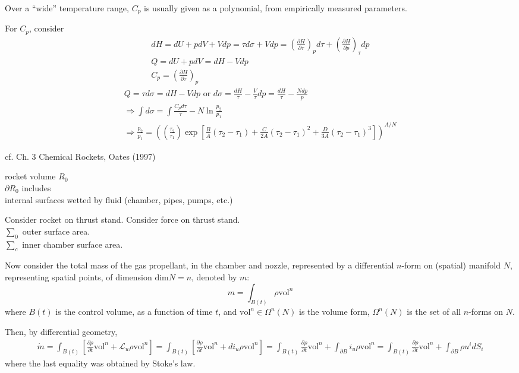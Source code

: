 \documentclass[10pt]{amsart}
\begin{document}
\begin{multicols*}{2}
\hrulefill

Over a ``wide'' temperature range, $C_p$ is usually given as a polynomial, from empirically measured parameters.  

For $C_p$, consider 
\[
\begin{gathered}
  dH = dU + pdV + Vdp = \tau d\sigma + Vdp = \left( \frac{ \partial H}{ \partial \tau} \right)_p d\tau + \left( \frac{ \partial H}{ \partial p} \right)_{\tau} dp \\
  Q = dU + pdV = dH - Vdp \\
  C_p = \left( \frac{ \partial H}{ \partial \tau} \right)_p 
\end{gathered}
\]
\[
\begin{gathered}
  Q = \tau d\sigma = dH - Vdp  \text{ or } d\sigma = \frac{dH}{\tau} - \frac{V}{\tau} dp = \frac{dH}{\tau} - \frac{Ndp}{p} \\
  \Longrightarrow \int d\sigma = \int \frac{C_pd\tau}{\tau} - N \ln{ \frac{p_2}{p_1}} \\
  \Longrightarrow \frac{p_2}{p_1} = \left( \left( \frac{\tau_2}{\tau_1} \right) \exp{ \left[ \frac{B}{A} (\tau_2 - \tau_1) + \frac{C}{2A}(\tau_2 - \tau_1)^2 + \frac{D}{3A}(\tau_2 - \tau_1)^3 \right] } \right)^{A/N}
\end{gathered}
\]


cf. Ch. 3 Chemical Rockets, Oates (1997) \cite{GOates1997}

rocket volume $R_0$ \\
$\partial R_0$ includes \\
\phantom{\quad \, } internal surfaces wetted by fluid (chamber, pipes, pumps, etc.) 

Consider rocket on thrust stand.  Consider force on thrust stand.  \\
$\sum_0$ outer surface area. \\
$\sum_c$ inner chamber surface area. 

Now consider the total mass of the gas propellant, in the chamber and nozzle, represented by a differential $n$-form on (spatial) manifold $N$, representing spatial points, of dimension $\text{dim}N=n$, denoted by $m$:
\[
m = \int_{B(t)} \rho \text{vol}^n
\]
where $B(t)$ is the control volume, as a function of time $t$, and $\text{vol}^n \in \Omega^n(N)$ is the volume form, $\Omega^n(N)$ is the set of all $n$-forms on $N$.  

Then, by differential geometry, 
\[
\begin{gathered}
  \dot{m} = \int_{B(t)} \left[ \frac{ \partial \rho }{ \partial t} \text{vol}^n + \mathcal{L}_u \rho \text{vol}^n \right] = \int_{B(t)} \left[ \frac{ \partial \rho }{ \partial t} \text{vol}^n + di_u \rho \text{vol}^n \right]   = \int_{B(t)} \frac{ \partial \rho}{ \partial t} \text{vol}^n + \int_{\partial B} i_u \rho \text{vol}^n = \int_{B(t)} \frac{ \partial \rho }{ \partial t} \text{vol}^n + \int_{\partial B} \rho u^i dS_i
\end{gathered}
\]
where the last equality was obtained by Stoke's law.  


\end{multicols*}
\end{document}
